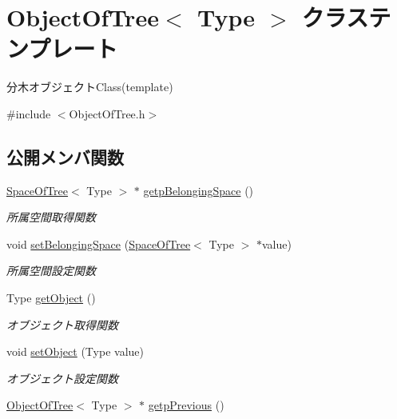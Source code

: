 \hypertarget{class_object_of_tree}{}\section{Object\+Of\+Tree$<$ Type $>$ クラステンプレート}
\label{class_object_of_tree}


分木オブジェクト\+Class(template)  




{\ttfamily \#include $<$Object\+Of\+Tree.\+h$>$}

\subsection*{公開メンバ関数}
\begin{DoxyCompactItemize}
\item 
\mbox{\hyperlink{class_space_of_tree}{Space\+Of\+Tree}}$<$ Type $>$ $\ast$ \mbox{\hyperlink{class_object_of_tree_a18ec17e546c20124926726081733ee69}{getp\+Belonging\+Space}} ()
\begin{DoxyCompactList}\small\item\em 所属空間取得関数 \end{DoxyCompactList}\item 
void \mbox{\hyperlink{class_object_of_tree_a21dc9105d1a5a0d045dc43894bba3c1c}{set\+Belonging\+Space}} (\mbox{\hyperlink{class_space_of_tree}{Space\+Of\+Tree}}$<$ Type $>$ $\ast$value)
\begin{DoxyCompactList}\small\item\em 所属空間設定関数 \end{DoxyCompactList}\item 
Type \mbox{\hyperlink{class_object_of_tree_a28214e15fffb72cb50b764e2f3ac863d}{get\+Object}} ()
\begin{DoxyCompactList}\small\item\em オブジェクト取得関数 \end{DoxyCompactList}\item 
void \mbox{\hyperlink{class_object_of_tree_aae14cb0e8ac8b701de737c547a1d3b8c}{set\+Object}} (Type value)
\begin{DoxyCompactList}\small\item\em オブジェクト設定関数 \end{DoxyCompactList}\item 
\mbox{\hyperlink{class_object_of_tree}{Object\+Of\+Tree}}$<$ Type $>$ $\ast$ \mbox{\hyperlink{class_object_of_tree_abdacc480e98a4dbaff33b13faf2d9ab4}{getp\+Previous}} ()

\end{DoxyCompactItemize}
